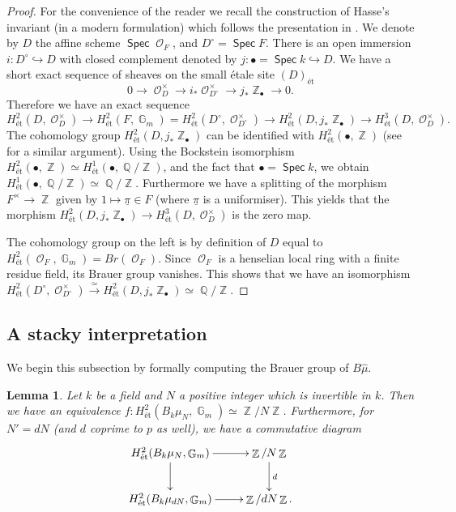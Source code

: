 \documentclass{article}
\DeclareMathOperator{\Zb}{\mathbb{Z}}
\DeclareMathOperator{\G}{\mathbb{G}}
\DeclareMathOperator{\Spec}{\mathsf{Spec}}
\DeclareMathOperator{\Oo}{\mathcal{O}}
\DeclareMathOperator{\Qb}{\mathbb{Q}}
\theoremstyle{definition}
\theoremstyle{plain}
\newtheorem{lemma}[definition]{Lemma}
\begin{document}
\begin{proof}
For the convenience of the reader we recall the construction of Hasse's invariant (in a modern formulation) which follows the presentation in \cite{MR559531}. We denote by $D$ the affine scheme $\Spec \Oo_F$, and $D^{\circ} = \Spec F$. There is an open immersion $i\colon D^{\circ} \hookrightarrow D$ with closed complement denoted by $j\colon \bullet = \Spec k\hookrightarrow D$. We have a short exact sequence of sheaves on the small \'etale site $(D)_{\text{\'et}}$
$$0 \to \Oo_{D}^{\times} \to i_*\Oo_{D^{\circ}}^{\times} \to j_*\Zb_{\bullet} \to 0.$$
Therefore we have an exact sequence
$$H^2_{\text{\'et}}(D,\Oo_D^{\times}) \to H^2_{\text{\'et}}(F,\G_m)= H^2_{\text{\'et}}(D^{\circ},\Oo_{D^{\circ}}^{\times}) \to H^2_{\text{\'et}}(D,j_*\Zb_{\bullet}) \to H^3_{\text{\'et}}(D,\Oo^{\times}_D).$$ The cohomology group $H^2_{\text{\'et}}(D,j_*\Zb_{\bullet})$ can be identified with $H^2_{\text{\'et}}(\bullet,\Zb)$ (see \cite[Example 2.22]{MR559531} for a similar argument). Using the Bockstein isomorphism $H^2_{\text{\'et}}(\bullet,\Zb) \simeq H^1_{\text{\'et}}(\bullet,\Qb/\Zb)$, and the fact that $\bullet = \Spec k$, we obtain $H^1_{\text{\'et}}(\bullet,\Qb/\Zb) \simeq \Qb/\Zb$. Furthermore we have a splitting of the morphism $F^{\times} \to \Zb$ given by $1 \mapsto \underline{\pi} \in F$ (where $\underline{\pi}$ is a uniformiser). This yields that the morphism $H^2_{\text{\'et}}(D,j_*\Zb_{\bullet}) \to H^3_{\text{\'et}}(D,\Oo^{\times}_D)$ is the zero map.

The cohomology group on the left is by definition of $D$ equal to $H^2_{\text{\'et}}(\Oo_F,\G_m) = Br(\Oo_F)$. Since $\Oo_F$ is a henselian local ring with a finite residue field, its Brauer group vanishes. This shows that we have an isomorphism $H^2_{\text{\'et}}(D^{\circ},\Oo_{D^{\circ}}^{\times}) \xrightarrow{\simeq} H^2_{\text{\'et}}(D,j_*\Zb_{\bullet}) \simeq \Qb/\Zb$.
\end{proof}

\subsection{A stacky interpretation}

We begin this subsection by formally computing the Brauer group of $B\widehat{\mu}$.

\begin{lemma}\label{lemma:Brauer_stack}
Let $k$ be a field and $N$ a positive integer which is invertible in $k$. Then we have an equivalence $f\colon H^2_{\text{\'et}}(B_k\mu_N,\G_m) \simeq \Zb/N\Zb$. Furthermore, for $N' = dN$ (and $d$ coprime to $p$ as well), we have a commutative diagram
\[
\xymatrix{
H^2_{\text{\'et}}(B_k\mu_N,\G_m) \ar[r] \ar[d] & \Zb/N\Zb \ar[d]^{d} \\
H^2_{\text{\'et}}(B_k\mu_{dN},\G_m)  \ar[r] & \Zb/dN\Zb.
}
\]
\end{lemma}
\end{document}
